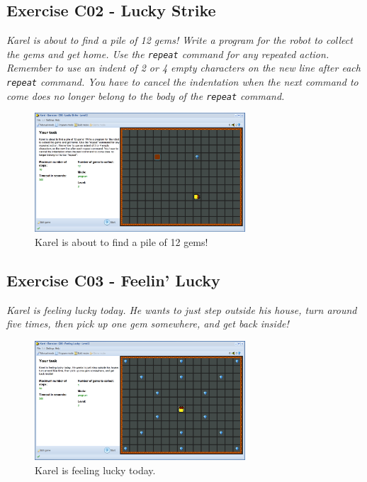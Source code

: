 \documentclass[article,A4,12pt]{llncs}
\begin{document}
\newpage

\subsection{Exercise C02 - Lucky Strike}

{\em Karel is about to find a pile of 12 gems! Write a program for the robot to collect the gems and get home. Use the {\tt repeat} command for any repeated action. Remember to use an indent of 2 or 4 empty characters on the new line after each {\tt repeat} command. You have to cancel the indentation when the next command to come does no longer belong to the body of the {\tt repeat} command. }

\begin{figure}[!ht]
\begin{center}
\includegraphics[width=0.7\textwidth]{img/c02.png}
\end{center}
\vspace{-4mm}
\caption{Karel is about to find a pile of 12 gems!}
\label{fig:c02}
\vspace{-4mm}
\end{figure}
\noindent


\subsection{Exercise C03 - Feelin' Lucky}

{\em Karel is feeling lucky today. He wants to just step outside his house, 
turn around five times, then pick up one gem somewhere, and get back inside!}


\begin{figure}[!ht]
\begin{center}
\includegraphics[width=0.7\textwidth]{img/c03.png}
\end{center}
\vspace{-4mm}
\caption{Karel is feeling lucky today.}
\label{fig:c03}
\vspace{-4mm}
\end{figure}
\noindent
\end{document}
